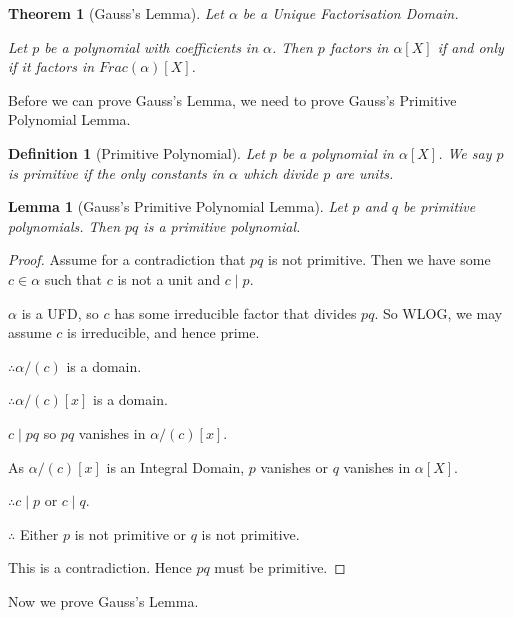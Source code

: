 \documentclass[pagesize=a4]{scrreprt}
\newtheorem{theorem}{Theorem}
\newtheorem{definition}{Definition}
\newtheorem{lemma}{Lemma}
\begin{document}
\begin{theorem}[Gauss's Lemma]
    Let $\alpha$ be a Unique Factorisation Domain. 

    Let $p$ be a polynomial with coefficients in $\alpha$. Then $p$ factors in $\alpha[X]$ if and only if it factors in $Frac(\alpha)[X]$.
\end{theorem}

Before we can prove Gauss's Lemma, we need to prove Gauss's Primitive Polynomial Lemma. 

\begin{definition}[Primitive Polynomial]

    Let $p$ be a polynomial in $\alpha[X]$. We say $p$ is primitive if the only constants in $ \alpha $ which divide $p$ are units. 

\end{definition}


\begin{lemma}[Gauss's Primitive Polynomial Lemma]
    Let $p$ and $q$ be primitive polynomials. Then $pq$ is a primitive polynomial.
\end{lemma}

\begin{proof}
    Assume for a contradiction that $pq$ is not primitive. 
    Then we have some $c \in \alpha$ such that $c$ is not a unit and $c \mid p$. 
   
    $\alpha$ is a UFD, so $c$ has some irreducible factor that divides $pq$. So WLOG, we may assume $c$ is irreducible, and hence prime.

    $\therefore \alpha/(c)$ is a domain.
    
    $\therefore \alpha/(c) [x]$ is a domain. 

    $c \mid pq$ so $pq$ vanishes in $\alpha/(c) [x]$. 

    As $\alpha/(c) [x]$ is an Integral Domain, $p$ vanishes or $q$ vanishes in $\alpha[X]$.

   $\therefore c \mid p$ or $c \mid q$. 
    
   $\therefore$ Either $p$ is not primitive or $q$ is not primitive. 

   This is a contradiction. Hence $pq$ must be primitive. 
  \end{proof}

  Now we prove Gauss's Lemma. 
\end{document}
